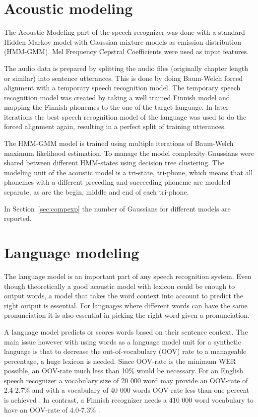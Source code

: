 \documentclass[b5paper]{article}
\newcommand{\ngram}{$n$-gram}
\begin{document}
\section{Acoustic modeling}
\label{sec:align}
The Acoustic Modeling part of the speech recognizer was done with a standard Hidden Markov model with Gaussian mixture models as emission distribution (HMM-GMM). Mel Frequency Cepstral Coefficients were used as input features. \cite{hirsimaki2009importance}

The audio data is prepared by splitting the audio files (originally chapter length or similar) into sentence utterances. This is done by doing Baum-Welch forced alignment with a temporary speech recognition model. The temporary speech recognition model was created by taking a well trained Finnish model and mapping the Finnish phonemes to the one of the target language. In later iterations the best speech recognition model of the language was used to do the forced alignment again, resulting in a perfect split of training utterances.

The HMM-GMM model is trained using multiple iterations of Baum-Welch maximum likelihood estimation. To manage the model complexity Gaussians were shared between different HMM-states using decision tree clustering. The modeling unit of the acoustic model is a tri-state, tri-phone, which means that all phonemes with a different preceding and succeeding phoneme are modeled separate, as are the begin, middle and end of each tri-phone.

In Section~\ref{sec:compexp} the number of Gaussians for different models are reported.


\section{Language modeling}

The language model is an important part of any speech recognition system. Even though theoretically a good acoustic model with lexicon could be enough to output words, a model that takes the word context into account to predict the right output is essential. For languages where different words can have the same pronunciation it is also essential in picking the right word given a pronunciation. 


A language model predicts or scores words based on their sentence context. The main issue however with using words as a language model unit for a synthetic language is that to decrease the out-of-vocabulary (OOV) rate to a manageable percentage, a huge lexicon is needed. Since OOV-rate is the minimum WER possible, an OOV-rate much less than 10\% would be necessary. For an English speech recognizer a vocabulary size of 20 000 word may provide an OOV-rate of 2.4-2.7\% and with a vocabulary of 40 000 words OOV-rate less than one percent is achieved \cite{woodland19951994}. In contrast, a Finnish recognizer needs a 410 000 word vocabulary to have an OOV-rate of 4.0-7.3\% \cite{hirsimaki2006unlimited}.
\end{document}
